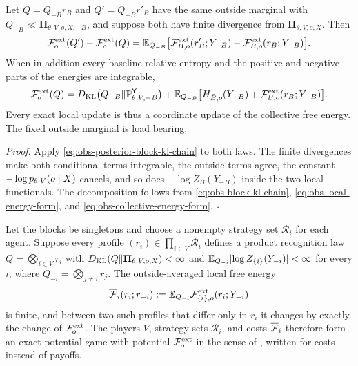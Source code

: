 Let $Q=Q_{-B}r_B$ and $Q'=Q_{-B}r'_B$ have the same outside marginal with
$Q_{-B}\ll\boldsymbol\Pi_{\theta,V,o,X,-B}$, and suppose both have finite
divergence from $\boldsymbol\Pi_{\theta,V,o,X}$. Then
\begin{equation}
\mathcal F^{\mathrm{ext}}_o(Q')-\mathcal F^{\mathrm{ext}}_o(Q)
=\mathbb E_{Q_{-B}}\bigl[\mathcal F^{\mathrm{ext}}_{B,o}(r'_B;Y_{-B})
-\mathcal F^{\mathrm{ext}}_{B,o}(r_B;Y_{-B})\bigr].
\label{eq:obs-local-global-potential}
\end{equation}
When in addition every baseline relative entropy and the positive and negative
parts of the energies are integrable,
\begin{equation}
\mathcal F^{\mathrm{ext}}_o(Q)
=D_{\mathrm{KL}}\bigl(Q_{-B}\Vert\mathbb P^{\mathsf Y}_{\theta,V,-B}\bigr)
+\mathbb E_{Q_{-B}}\bigl[H_{\bar B,o}(Y_{-B})+\mathcal F^{\mathrm{ext}}_{B,o}(r_B;Y_{-B})\bigr].
\label{eq:obs-local-global-decomposition}
\end{equation}
Every exact local update is thus a coordinate update of the collective free
energy. The fixed outside marginal is load bearing. 

\noindent\emph{Proof.}
Apply \eqref{eq:obs-posterior-block-kl-chain} to both laws. The finite
divergences make both conditional terms integrable, the outside terms agree,
the constant $-\log p_{\theta,V}(o\mid X)$ cancels, and so does
$-\log Z_B(Y_{-B})$ inside the two local functionals. The decomposition follows
from \eqref{eq:obs-block-kl-chain}, \eqref{eq:obs-local-energy-form}, and
\eqref{eq:obs-collective-energy-form}. \hfill$\square$

Let the blocks be singletons and choose a nonempty strategy set $\mathcal R_i$
for each agent. Suppose every profile $(r_i)\in\prod_{i\in V}\mathcal R_i$
defines a product recognition law $Q=\bigotimes_{i\in V}r_i$ with
$D_{\mathrm{KL}}(Q\Vert\boldsymbol\Pi_{\theta,V,o,X})<\infty$ and
$\mathbb E_{Q_{-i}}\lvert\log Z_{\{i\}}(Y_{-i})\rvert<\infty$ for every $i$, where
$Q_{-i}=\bigotimes_{j\ne i}r_j$. The outside-averaged local free energy
\begin{equation}
\overline{\mathcal F}_i(r_i;r_{-i}):=\mathbb E_{Q_{-i}}\mathcal F^{\mathrm{ext}}_{\{i\},o}(r_i;Y_{-i})
\label{eq:obs-outside-averaged-local-vfe}
\end{equation}
is finite, and between two such profiles that differ only in $r_i$ it changes by
exactly the change of $\mathcal F^{\mathrm{ext}}_o$. The players $V$, strategy sets
$\mathcal R_i$, and costs $\overline{\mathcal F}_i$ therefore form an exact potential game
with potential $\mathcal F^{\mathrm{ext}}_o$ in the sense of
\citet[Sec.~2]{MondererShapley1996}, written for costs instead of payoffs.

